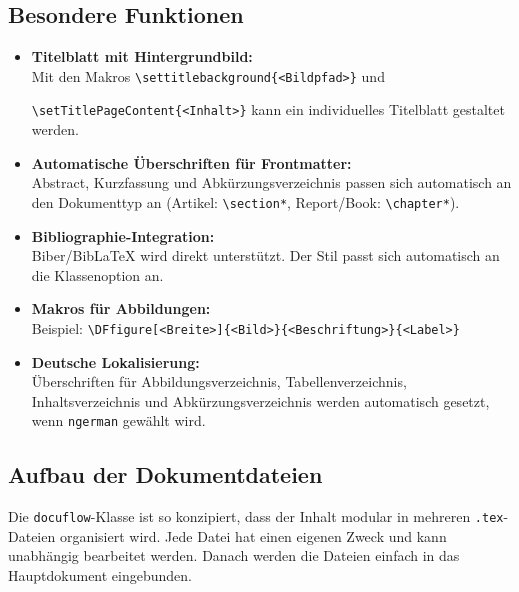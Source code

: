 \subsection*{Besondere Funktionen}

\begin{itemize}
    \item \textbf{Titelblatt mit Hintergrundbild:}\\
    Mit den Makros \verb|\settitlebackground{<Bildpfad>}| und 
    
    \verb|\setTitlePageContent{<Inhalt>}| kann ein individuelles Titelblatt gestaltet werden.

    \item \textbf{Automatische Überschriften für Frontmatter:}\\
    Abstract, Kurzfassung und Abkürzungsverzeichnis passen sich automatisch an den Dokumenttyp an (Artikel: \verb|\section*|, Report/Book: \verb|\chapter*|).

    \item \textbf{Bibliographie-Integration:}\\
    Biber/BibLaTeX wird direkt unterstützt. Der Stil passt sich automatisch an die Klassenoption an.

    \item \textbf{Makros für Abbildungen:}\\
    Beispiel: \verb|\DFfigure[<Breite>]{<Bild>}{<Beschriftung>}{<Label>}|
    
    \item \textbf{Deutsche Lokalisierung:}\\
    Überschriften für Abbildungsverzeichnis, Tabellenverzeichnis, Inhaltsverzeichnis und Abkürzungsverzeichnis werden automatisch gesetzt, wenn \texttt{ngerman} gewählt wird.
\end{itemize}


\clearpage

\subsection*{Aufbau der Dokumentdateien}

Die \texttt{docuflow}-Klasse ist so konzipiert, dass der Inhalt modular in mehreren \texttt{.tex}-Dateien organisiert wird. Jede Datei hat einen eigenen Zweck und kann unabhängig bearbeitet werden. Danach werden die Dateien einfach in das Hauptdokument eingebunden.

